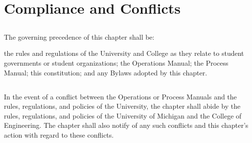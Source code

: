 \chapter{Compliance and Conflicts}\label{sec:compliance}

\section{}
The governing precedence of this chapter shall be:


\begin{enumsubsection}
\itemnotoc the rules and regulations of the University and College as they relate to student governments or student organizations;
\itemnotoc the \hkn Operations Manual;
\itemnotoc the \hkn Process Manual;
\itemnotoc this constitution; and
\itemnotoc any Bylaws adopted by this chapter.
\end{enumsubsection}

\section{}
In the event of a conflict between the \hkn Operations or Process Manuals and the rules, regulations, and policies of the University, the chapter shall abide by the rules, regulations, and policies of the University of Michigan and the College of Engineering. The chapter shall also notify \hkn of any such conflicts and this chapter's action with regard to these conflicts.
